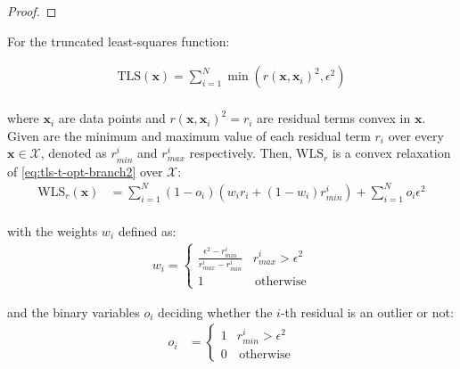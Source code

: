 \begin{proof}
\end{proof}

\begin{theorem}
	
	For the truncated least-squares function:
	
	\begin{equation}
		\label{eq:tls-t-opt-branch2}
		\begin{aligned}
			\text{TLS}(\mathbf{x}) = \sum_{i=1}^{N} \min \left(r(\mathbf{x}, \mathbf{x}_i)^2, \epsilon^2 \right)\\
		\end{aligned}
	\end{equation}
	
	where $\mathbf{x}_i$ are data points and $r(\mathbf{x}, \mathbf{x}_i)^2 = r_i$ are residual terms convex in $\mathbf{x}$. Given are the minimum and maximum value of each residual term $r_i$ over every $\mathbf{x} \in \mathcal{X}$, denoted as $r_{min}^i$ and $r_{max}^i$ respectively. Then, $\text{WLS}_{r}$ is a convex relaxation of \ref{eq:tls-t-opt-branch2} over $\mathcal{X}$:
	\begin{equation}
		\label{eq:tls-wls-relaxation}
		\begin{aligned}	
			\text{WLS}_{r}(\mathbf{x}) &= 
			\sum_{i=1}^{N} (1 - o_i) \left(w_i r_i  + (1 - w_i) r_{min}^i \right) + \sum_{i=1}^{N} o_i\epsilon^2\\
		\end{aligned}
	\end{equation}
	
	with the weights $w_i$ defined as:
	\begin{equation}
		\begin{aligned}	
			w_i  = 
			\begin{cases}
				\frac{\epsilon^2 - r_{min}^i}{r_{max}^i - r_{min}^i} &  r_{max}^i > \epsilon^2\\
				1 & \, \text{otherwise}
			\end{cases}
		\end{aligned}
	\end{equation}
	
	and the binary variables $o_i$ deciding whether the $i$-th residual is an outlier or not:
	\begin{equation}
		\begin{aligned}	
			o_i &= \begin{cases}
				1 &  r_{min}^i > \epsilon^2\\
				0 & \, \text{otherwise}
			\end{cases}
		\end{aligned}
	\end{equation}
	
\end{theorem}	

